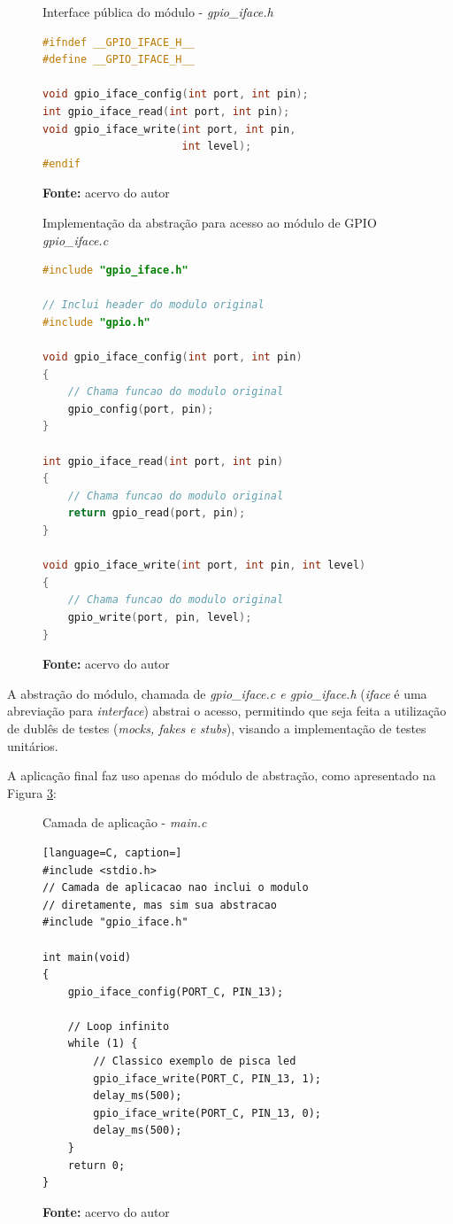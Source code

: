 \documentclass[times, twoside, watermark]{artigo}
\begin{document}
\begin{figure}[H]
  \centering
  \caption{Interface pública do módulo - \textit{gpio\_iface.h}}
\begin{lstlisting}[language=C]
#ifndef __GPIO_IFACE_H__
#define __GPIO_IFACE_H__

void gpio_iface_config(int port, int pin);
int gpio_iface_read(int port, int pin);
void gpio_iface_write(int port, int pin,
                      int level);
#endif
\end{lstlisting}
  \label{fig:gpio_iface.h}
  \caption*{\newline\textbf{Fonte:} acervo do autor}
\end{figure}

\begin{figure}[H]
  \centering
  \caption{Implementação da abstração para acesso ao módulo de GPIO
\textit{gpio\_iface.c}}
\begin{lstlisting}[language=C]
#include "gpio_iface.h"

// Inclui header do modulo original
#include "gpio.h"

void gpio_iface_config(int port, int pin)
{
    // Chama funcao do modulo original
    gpio_config(port, pin);
}

int gpio_iface_read(int port, int pin)
{
    // Chama funcao do modulo original
    return gpio_read(port, pin);
}

void gpio_iface_write(int port, int pin, int level)
{
    // Chama funcao do modulo original
    gpio_write(port, pin, level);
}
\end{lstlisting}
  \label{fig:gpio_iface.c}
  \caption*{\newline\textbf{Fonte:} acervo do autor}
\end{figure}

A abstração do módulo, chamada de \textit{gpio\_iface.c e gpio\_iface.h}
(\textit{iface} é uma abreviação para \textit{interface}) abstrai o
acesso, permitindo que seja feita a utilização de dublês de testes (\textit{mocks,
  fakes e stubs}), visando a implementação de testes unitários.

A aplicação final faz uso apenas do módulo de abstração, como apresentado na Figura 
\ref{fig:main.c}:\hfill\\

\begin{figure}[H]
  \centering
  \caption{Camada de aplicação - \textit{main.c}}
\begin{lstlisting}[language=C, caption=]
#include <stdio.h>
// Camada de aplicacao nao inclui o modulo
// diretamente, mas sim sua abstracao
#include "gpio_iface.h"

int main(void)
{
    gpio_iface_config(PORT_C, PIN_13);
    
    // Loop infinito
    while (1) {
        // Classico exemplo de pisca led
        gpio_iface_write(PORT_C, PIN_13, 1);
        delay_ms(500);
        gpio_iface_write(PORT_C, PIN_13, 0);
        delay_ms(500);
    }
    return 0;
}
\end{lstlisting}
  \label{fig:main.c}
  \caption*{\newline\textbf{Fonte:} acervo do autor}
\end{figure}
\end{document}
